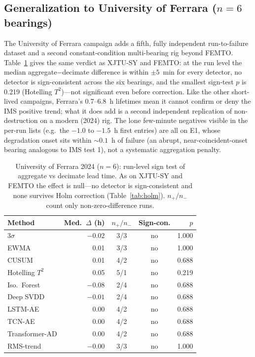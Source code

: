 \documentclass[IJPHM, 2026, 0]{PHMSociety}
\begin{document}
\subsection{Generalization to University of Ferrara ($n=6$ bearings)}
The University of Ferrara campaign \cite{arpa2024ferrara} adds a fifth, fully independent run-to-failure dataset and a second constant-condition multi-bearing rig beyond FEMTO. Table~\ref{tab:ferrara} gives the same verdict as XJTU-SY and FEMTO: at the run level the median aggregate$-$decimate difference is within $\pm5$~min for every detector, no detector is sign-consistent across the six bearings, and the smallest sign-test $p$ is 0.219 (Hotelling $T^2$)---not significant even before correction. Like the other short-lived campaigns, Ferrara's 0.7--6.8~h lifetimes mean it cannot confirm or deny the IMS positive trend; what it does add is a second independent replication of non-destruction on a modern (2024) rig. The lone few-minute negatives visible in the per-run lists (e.g.\ the $-1.0$ to $-1.5$~h first entries) are all on E1, whose degradation onset sits within ${\sim}0.1$~h of failure (an abrupt, near-coincident-onset bearing analogous to IMS test 1), not a systematic aggregation penalty.

\begin{table}[t] \small
	\begin{center}
	\caption{University of Ferrara 2024 ($n=6$): run-level sign test of aggregate vs decimate lead time. As on XJTU-SY and FEMTO the effect is null---no detector is sign-consistent and none survives Holm correction (Table~\ref{tab:holm}). $n_+/n_-$ count only non-zero-difference runs.}
	\label{tab:ferrara}
	\begin{tabular}{l r c c r}
		\hline \hline
		\textbf{Method} & \textbf{Med.\ $\Delta$ (h)} & \textbf{$n_+/n_-$} & \textbf{Sign-con.} & \textbf{$p$} \\
		\hline
		$3\sigma$ & $-0.02$ & 3/3 & no & 1.000 \\
		EWMA & 0.01 & 3/3 & no & 1.000 \\
		CUSUM & 0.01 & 4/2 & no & 0.688 \\
		Hotelling $T^2$ & 0.05 & 5/1 & no & 0.219 \\
		Iso.\ Forest & $-0.08$ & 2/4 & no & 0.688 \\
		Deep SVDD & $-0.01$ & 2/4 & no & 0.688 \\
		LSTM-AE & 0.00 & 4/2 & no & 0.688 \\
		TCN-AE & 0.00 & 4/2 & no & 0.688 \\
		Transformer-AD & 0.00 & 4/2 & no & 0.688 \\
		RMS-trend & $-0.00$ & 3/3 & no & 1.000 \\
		\hline \hline
	\end{tabular}
	\end{center}
\end{table}
\end{document}
